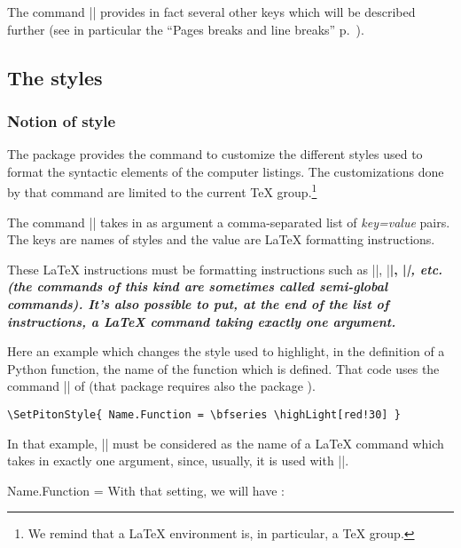 \documentclass{article}
\begin{document}
\bigskip
The command |\PitonOptions| provides in fact several other keys which will be
described further (see in particular the ``Pages breaks and line breaks''
p.~\pageref{breakable}). 

\subsection{The styles}

\label{styles}

\subsubsection{Notion of style}

The package  provides the command
 to customize the different styles used to
format the syntactic elements of the computer listings. The customizations done
by that command are limited to the current TeX group.\footnote{We remind that
a LaTeX environment is, in particular, a TeX group.}

\bigskip
{}
The command |\SetPitonStyle| takes in as argument a comma-separated list of
\textsl{key=value} pairs. The keys are names of styles and the value are LaTeX
formatting instructions.

\bigskip
These LaTeX instructions must be formatting instructions such as
|\color{ }|, |\bfseries|, |\slshape|, etc. (the commands of this kind are
sometimes called \emph{semi-global} commands). It's also possible to put,
\emph{at the end of the list of instructions}, a LaTeX command taking exactly
one argument.

\bigskip
Here an example which changes the style used to highlight, in the definition
of a Python function, the name of the function which is defined. That code
uses the command |\highLight| of  (that package requires also the
package ).

\begin{verbatim}
\SetPitonStyle{ Name.Function = \bfseries \highLight[red!30] }
\end{verbatim}

In that example, |\highLight[red!30]| must be considered as the name of a
LaTeX command which takes in exactly one argument, since, usually, it is used
with ||.

\medskip
\begingroup
\SetPitonStyle 
  { Name.Function = \bfseries \highLight[red!30] }
With that setting, we will have : 
\endgroup
\end{document}
